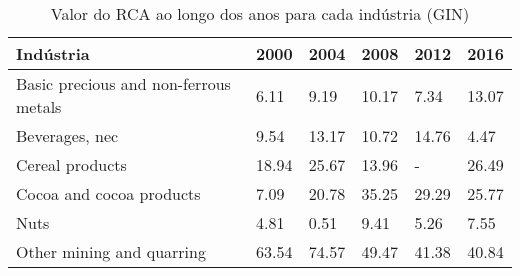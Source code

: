 \begin{table}
\centering
\caption{Valor do RCA ao longo dos anos para cada indústria (GIN)}
\label{tab:ex3-tempo-GIN}
\begin{tabular}{p{6cm}p{1.5cm}p{1.5cm}p{1.5cm}p{1.5cm}p{1.5cm}}
\toprule
                            Indústria &  2000 &  2004 &  2008 &  2012 &  2016 \\
\midrule
Basic precious and non-ferrous metals &  6.11 &  9.19 & 10.17 &  7.34 & 13.07 \\
                       Beverages, nec &  9.54 & 13.17 & 10.72 & 14.76 &  4.47 \\
                      Cereal products & 18.94 & 25.67 & 13.96 &     - & 26.49 \\
             Cocoa and cocoa products &  7.09 & 20.78 & 35.25 & 29.29 & 25.77 \\
                                 Nuts &  4.81 &  0.51 &  9.41 &  5.26 &  7.55 \\
            Other mining and quarring & 63.54 & 74.57 & 49.47 & 41.38 & 40.84 \\
\bottomrule
\end{tabular}
\end{table}
